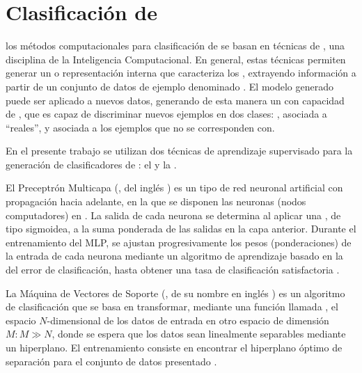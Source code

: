 %
%
%
\section{Clasificación de }
%
los métodos computacionales para clasificación de  se basan
en técnicas de , una disciplina
de la Inteligencia Computacional.
En general, estas técnicas permiten generar un  o
representación interna que caracteriza los , extrayendo
información a partir de un conjunto de datos de ejemplo denominado
.
El modelo generado puede ser aplicado a nuevos datos, generando de
esta manera un  con capacidad de
, que es capaz de discriminar nuevos ejemplos en dos
clases: , asociada a  ``reales'', y
 asociada a los ejemplos que no se corresponden
con.

En el presente trabajo se utilizan dos técnicas de aprendizaje
supervisado para la generación de clasificadores de : el
 \cite{mlp1,mlp2} y la  \cite{svm}.

El Preceptrón Multicapa (, del inglés ) es un tipo de red neuronal artificial con propagación
hacia adelante, en la que se disponen las neuronas (nodos
computadores) en .
La salida de cada neurona se determina al
aplicar una , de tipo sigmoidea, a la suma
ponderada de las salidas en la capa anterior.
Durante el entrenamiento
del MLP, se ajustan progresivamente los pesos (ponderaciones) de la
entrada de cada neurona mediante un algoritmo de aprendizaje basado en
la  del error de clasificación, hasta
obtener una tasa de clasificación satisfactoria \cite{jain}.

La Máquina de Vectores de Soporte (, de su nombre en inglés
) es un algoritmo de clasificación que se
basa en transformar, mediante una función llamada , el
espacio $N$-dimensional de los datos de entrada en otro espacio de
dimensión $M: M\gg N$, donde se espera que los datos sean linealmente
separables mediante un hiperplano.
El entrenamiento consiste en
encontrar el hiperplano óptimo de separación para el conjunto de datos
presentado \cite{bottou}.
